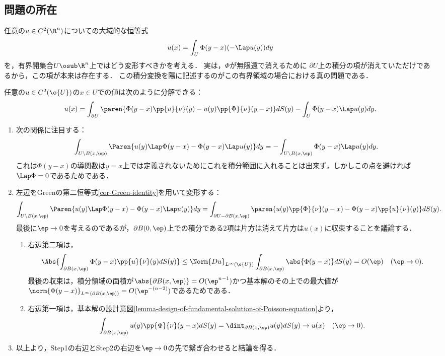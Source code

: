 \documentclass[uplatex,dvipdfmx]{jsreport}
\begin{document}
\subsection{問題の所在}

\begin{tcolorbox}[colframe=ForestGreen, colback=ForestGreen!10!white,breakable,colbacktitle=ForestGreen!40!white,coltitle=black,fonttitle=\bfseries\sffamily,
title=]
    任意の$u\in C^2(\R^n)$についての大域的な恒等式
    \[u(x)=\int_U\Phi(y-x)(-\Lap u(y))dy\]
    を，有界開集合$U\osub\R^n$上ではどう変形すべきかを考える．
    実は，$\Phi$が無限遠で消えるために
    $\partial U$上の積分の項が消えていただけであるから，この項が本来は存在する．
    この積分変換を陽に記述するのがこの有界領域の場合における真の問題である．
\end{tcolorbox}

\begin{lemma}
    任意の$u\in C^2(\o{U})$の$x\in U$での値は次のように分解できる：
    \[u(x)=\int_{\partial U}\paren{\Phi(y-x)\pp{u}{\nu}(y)-u(y)\pp{\Phi}{\nu}(y-x)}dS(y)-\int_U\Phi(y-x)\Lap u(y)dy.\]
\end{lemma}
\begin{Proof}\mbox{}
    \begin{enumerate}[{Step}1]
        \item 次の関係に注目する：
        \[\int_{U\setminus B(x,\ep)}\Paren{u(y)\Lap\Phi(y-x)-\Phi(y-x)\Lap u(y)}dy=-\int_{U\setminus B(x,\ep)}\Phi(y-x)\Lap u(y)dy.\]
        これは$\Phi(y-x)$の導関数は$y=x$上では定義されないためにこれを積分範囲に入れることは出来ず，しかしこの点を避ければ$\Lap\Phi=0$であるためである．
        \item 左辺をGreenの第二恒等式\ref{cor-Green-identity}を用いて変形する：
        \begin{align*}
            \int_{U\setminus B(x,\ep)}\Paren{u(y)\Lap\Phi(y-x)-\Phi(y-x)\Lap u(y)}dy&=\int_{\partial U-\partial B(x,\ep)}\paren{u(y)\pp{\Phi}{\nu}(y-x)-\Phi(y-x)\pp{u}{\nu}(y)}dS(y).
        \end{align*}
        最後に$\ep\to0$を考えるのであるが，$\partial B(0,\ep)$上での積分である2項は片方は消えて片方は$u(x)$に収束することを議論する．
        \begin{enumerate}
            \item 右辺第二項は，
            \[\Abs{\int_{\partial B(x,\ep)}\Phi(y-x)\pp{u}{\nu}(y)dS(y)}\le\Norm{Du}_{L^\infty(\o{U})}\int_{\partial B(x,\ep)}\abs{\Phi(y-x)}dS(y)=O(\ep)\quad(\ep\to0).\]
            最後の収束は，積分領域の面積が$\abs{\partial B(x,\ep)}=O(\ep^{n-1})$かつ基本解のその上での最大値が$\norm{\Phi(y-x)}_{L^\infty(\partial B(x,\ep))}=O(\ep^{-(n-2)})$であるためである．
            \item 右辺第一項は，基本解の設計意図\ref{lemma-design-of-fundamental-solution-of-Poisson-equation}より，
            \[\int_{\partial B(x,\ep)}u(y)\pp{\Phi}{\nu}(y-x)dS(y)=\dint_{\partial B(x,\ep)}u(y)dS(y)\to u(x)\quad(\ep\to0).\]
        \end{enumerate}
        \item 以上より，Step1の右辺とStep2の右辺を$\ep\to0$の先で繋ぎ合わせると結論を得る．
    \end{enumerate}
\end{Proof}
\end{document}
